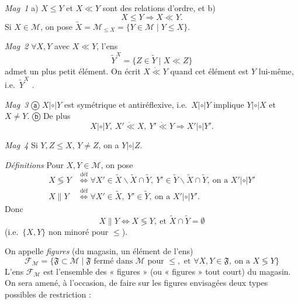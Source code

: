 \documentclass[11pt,a4paper]{article}
\begin{document}
\emph{Mag~1} a) $X \leq Y$ et $X \ll Y$ sont des relations d'ordre, et b)
\[
  X \leq Y \Longrightarrow X \ll Y .
\]
Si $X \in \mathcal{M}$, on pose $\widetilde{X} = \mathcal{M}_{\leq X} = \{ Y \in \mathcal{M} \mid Y \leq X \}$.

\emph{Mag~2} $\forall X, Y$ avec $X \ll Y$, l'ens
\[
  \widetilde{Y}^{X} = \{ Z \in \widetilde{Y} \mid X \ll Z \}
\]
admet un plus petit élément. On écrit $X \mathring{\ll} Y$ quand cet élément est $Y$ lui-même, i.e.\ $\widetilde{Y}^{X}$ .

\emph{Mag~3} ⓐ $X |\circ| Y$ est symétrique et antiréflexive, i.e.\ $X |\circ| Y$ implique $Y |\circ| X$ et $X \neq Y$. ⓑ De plus
\[
  X |\circ| Y,\ X' \mathring{\ll} X,\ Y' \mathring{\ll} Y \Longrightarrow X' |\circ| Y' .
\]

\emph{Mag~4} Si $Y, Z \leq X$,  $Y \neq Z$, on a $Y |\circ| Z$.


\emph{Définitions} Pour $X, Y \in \mathcal{M}$, on pose
\[
\begin{aligned}
  X \lessgtr Y &\overset{\text{déf}}{\Longleftrightarrow} \forall X' \in \widetilde{X} \smallsetminus \widetilde{X} \cap \widetilde{Y},\ Y' \in \widetilde{Y} \smallsetminus \widetilde{X} \cap \widetilde{Y},\ \text{on a } X' |\circ| Y' \\
  X \parallel Y &\overset{\text{déf}}{\Longleftrightarrow} \forall X' \in \widetilde{X},\ Y' \in \widetilde{Y},\ \text{on a } X' |\circ| Y' .
\end{aligned}
\]
Donc
\[
  X \parallel Y \Longleftrightarrow X \lessgtr Y,\ \text{et } \widetilde{X} \cap \widetilde{Y} = \emptyset
\]
(i.e.\ $\{X, Y\}$ non minoré pour $\leq$).

On appelle \emph{figures} (du magasin, un élément de l'ens)
\[
  \mathcal{F}_{\mathcal{M}} = \{ \mathfrak{F} \subset \mathcal{M} \mid \mathfrak{F} \text{ fermé dans } \mathcal{M} \text{ pour } \leq, \text{ et } \forall X, Y \in \mathfrak{F},\ \text{on a } X \lessgtr Y \}
\]
L'ens $\mathcal{F}_{\mathcal{M}}$ est l'ensemble des « figures  » (ou « figures » tout court) du magasin. On sera amené, à l'occasion, de faire sur les figures envisagées deux types possibles de restriction :
\end{document}
